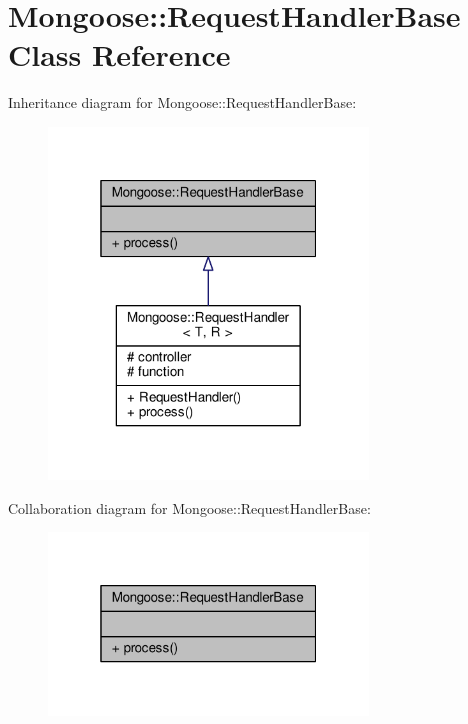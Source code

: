 \hypertarget{classMongoose_1_1RequestHandlerBase}{}\section{Mongoose\+:\+:Request\+Handler\+Base Class Reference}
\label{classMongoose_1_1RequestHandlerBase}


Inheritance diagram for Mongoose\+:\+:Request\+Handler\+Base\+:
\nopagebreak
\begin{figure}[H]
\begin{center}
\leavevmode
\includegraphics[width=241pt]{d3/dfa/classMongoose_1_1RequestHandlerBase__inherit__graph}
\end{center}
\end{figure}


Collaboration diagram for Mongoose\+:\+:Request\+Handler\+Base\+:
\nopagebreak
\begin{figure}[H]
\begin{center}
\leavevmode
\includegraphics[width=241pt]{d9/d48/classMongoose_1_1RequestHandlerBase__coll__graph}
\end{center}
\end{figure}
